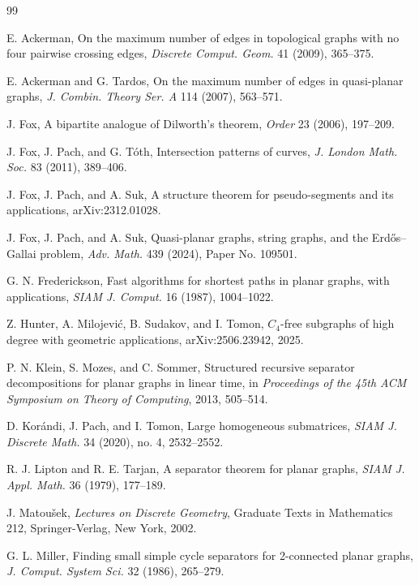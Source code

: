 \documentclass[11pt]{article}
\theoremstyle{plain}
\theoremstyle{definition}
\theoremstyle{remark}
\begin{document}
\begin{thebibliography}{99}

E. Ackerman,
On the maximum number of edges in topological graphs with no four pairwise crossing edges,
\emph{Discrete Comput. Geom.} 41 (2009), 365--375.

E. Ackerman and G. Tardos,
On the maximum number of edges in quasi-planar graphs,
\emph{J. Combin. Theory Ser. A} 114 (2007), 563--571.

J. Fox,
A bipartite analogue of Dilworth's theorem,
\emph{Order} 23 (2006), 197--209.

J. Fox, J. Pach, and G. T\'oth,
Intersection patterns of curves,
\emph{J. London Math. Soc.} 83 (2011), 389--406.

J. Fox, J. Pach, and A. Suk,
A structure theorem for pseudo-segments and its applications,
arXiv:2312.01028.

J. Fox, J. Pach, and A. Suk,
Quasi-planar graphs, string graphs, and the Erd\H{o}s--Gallai problem,
\emph{Adv. Math.} 439 (2024), Paper No. 109501.

G. N. Frederickson,
Fast algorithms for shortest paths in planar graphs, with applications,
\emph{SIAM J. Comput.} 16 (1987), 1004--1022.

Z. Hunter, A. Milojevi\'c, B. Sudakov, and I. Tomon,
\(C_4\)-free subgraphs of high degree with geometric applications,
arXiv:2506.23942, 2025.

P. N. Klein, S. Mozes, and C. Sommer,
Structured recursive separator decompositions for planar graphs in linear time,
in \emph{Proceedings of the 45th ACM Symposium on Theory of Computing},
2013, 505--514.

D. Kor\'andi, J. Pach, and I. Tomon,
Large homogeneous submatrices,
\emph{SIAM J. Discrete Math.} 34 (2020), no. 4, 2532--2552.

R. J. Lipton and R. E. Tarjan,
A separator theorem for planar graphs,
\emph{SIAM J. Appl. Math.} 36 (1979), 177--189.


J. Matou\v{s}ek,
\emph{Lectures on Discrete Geometry},
Graduate Texts in Mathematics 212,
Springer-Verlag, New York, 2002.



G. L. Miller,
Finding small simple cycle separators for 2-connected planar graphs,
\emph{J. Comput. System Sci.} 32 (1986), 265--279.


\end{thebibliography}
\end{document}
